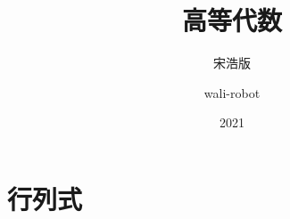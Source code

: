 \documentclass[cn,chinese,11pt]{elegantbook}
\title{高等代数}
\subtitle{宋浩版}
\author{wali-robot}
\institute{B站大学}
\date{2021}
\begin{document}
    \maketitle
    \frontmatter
    \tableofcontents

    \mainmatter
    \chapter{行列式}
        
\end{document}

